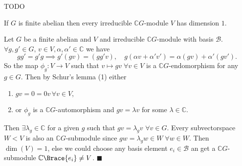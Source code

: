 \documentclass[../Project.tex]{subfiles}
\begin{document}
\begin{proo*}
	TODO
\end{proo*}

\begin{prop}[\cite{2}]
	If $G$ is finite abelian then every irreducible $\mathbb{C}G$-module $V$ has dimension $1$.
\end{prop}
\begin{proo*}
	Let $G$ be a finite abelian and $V$ and irreducible $\mathbb{C}G$-module with basis $\mathcal{B}$. $\forall g,g' \in G,\,v \in V,\alpha,\alpha' \in \mathbb{C}$ we have
	$$gg' = g'g \implies g'(gv) = (gg'v),\quad g(\alpha v + \alpha'v') = \alpha(gv) + \alpha'(gv').$$
	So the map $\phi_g : V \to V$ such that $v \mapsto gv \;\forall v \in V$ is a $\mathbb{C}G$-endomorphism for any $g \in G$. Then by Schur's lemma (1) either
	\begin{enumerate}
		\item $gv = 0 = 0v\, \forall v \in V$,
		\item or $\phi_g$ is a $\mathbb{C}G$-automorphism and $gv = \lambda v$ for some $\lambda \in \mathbb{C}$.
	\end{enumerate}
	Then  $\exists \lambda_g \in \mathbb{C}$ for a given $g$ such that $gv = \lambda_g v$ $\forall v \in G$. Every subvectorspace $W < V$ is also an $\mathbb{C}G$-submodule since $gw = \lambda_gw \in W\; \forall w \in W$. Then $\dim(V) = 1$, else we could choose any basis element $e_i \in \mathcal{B}$ an get a $\mathbb{C}G$-submodule $\mathbb{C}\Brace{e_i} \neq V$. $\blacksquare$
\end{proo*}
\end{document}
